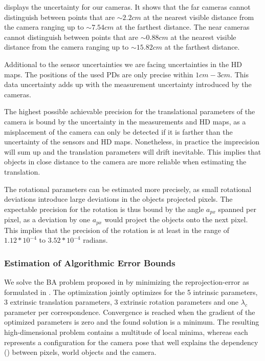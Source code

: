  displays the uncertainty for our cameras.
It shows that the far cameras cannot distinguish between points that are $\sim 2.2 cm$ at the nearest visible distance from the camera ranging up to $\sim 7.54 cm$ at the farthest distance.
The near cameras cannot distinguish between points that are $\sim 0.88 cm$ at the nearest visible distance from the camera ranging up to $\sim 15.82 cm$ at the farthest distance.

Additional to the sensor uncertainties we are facing uncertainties in the HD maps.
The positions of the used PDs are only precise within $1cm - 3cm$. 
This data uncertainty adds up with the measurement uncertainty introduced by the cameras.

The highest possible achievable precision for the translational parameters of the camera is bound by the uncertainty in the measurements and HD maps, as a misplacement of the camera can only be detected if it is farther than the uncertainty of the sensors and HD maps.
Nonetheless, in practice the imprecision will sum up and the translation parameters will drift inevitable. 
This implies that objects in close distance to the camera are more reliable when estimating the translation.

The rotational parameters can be estimated more precisely, as small rotational deviations introduce large deviations in the objects projected pixels.
The expectable precision for the rotation is thus bound by the angle $a_{px}$ spanned per pixel, as a deviation by one $a_{px}$ would project the objects onto the next pixel.
This implies that the precision of the rotation is at least in the range of $1.12 * 10^{-4}$ to $3.52 * 10^{-4}$ radians. 


\subsubsection{Estimation of Algorithmic Error Bounds}
We solve the BA problem proposed in  by minimizing the reprojection-error as formulated in .
The optimization jointly optimizes for the 5 intrinsic parameters, 3 extrinsic translation parameters, 3 extrinsic rotation parameters and one $\lambda_c$ parameter per correspondence.
Convergence is reached when the gradient of the optimized parameters is zero and the found solution is a minimum.
The resulting high-dimensional problem contains a multitude of local minima, whereas each represents a configuration for the camera pose that well explains the dependency () between pixels, world objects and the camera. 


